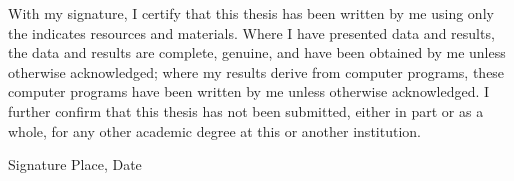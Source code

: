 \documentclass[a4paper,11pt,oneside]{article}
\begin{document}
  \newpage
  \thispagestyle{empty}

  With my signature, I certify that this thesis has been written by me
  using only the indicates resources and materials. Where I have
  presented data and results, the data and results are complete,
  genuine, and have been obtained by me unless otherwise acknowledged;
  where my results derive from computer programs, these computer
  programs have been written by me unless otherwise acknowledged. I
  further confirm that this thesis has not been submitted, either in
  part or as a whole, for any other academic degree at this or another
  institution.

  \vspace{20mm}

  Signature \hfill Place, Date

  \newpage
  \begin{abstract}


  \end{abstract}


  \clearpage
\fi



\newpage
\tableofcontents

\newpage
\listoffigures

\newpage
\end{document}

